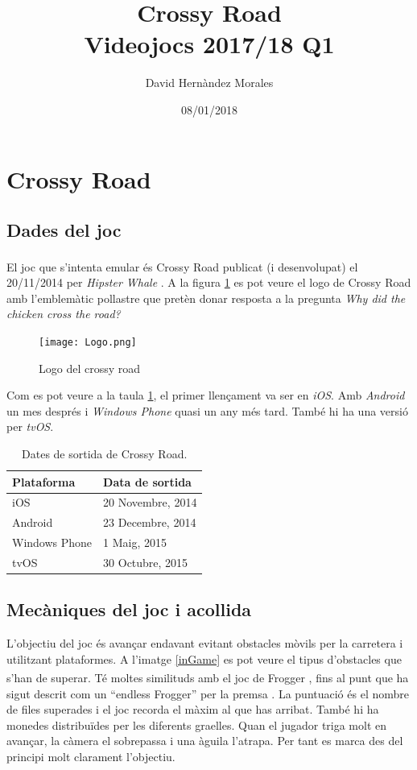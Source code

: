 \documentclass{article}
\title{Crossy Road \\
		\large Videojocs 2017/18 Q1}
\author{David Hernàndez Morales}
\date{08/01/2018}
\begin{document}
\maketitle
\newpage
\tableofcontents
\newpage
{}
\section{Crossy Road}
\subsection{Dades del joc}
El joc que s'intenta emular és Crossy Road \textsuperscript{\texttrademark}
publicat (i desenvolupat) el 20/11/2014 per \textit{Hipster Whale} \cite{webCrossy}
\cite{wikipediaCrossy}. A la figura \ref{logo} es pot veure el logo de Crossy Road
amb l'emblemàtic pollastre que pretèn donar resposta a la pregunta
\textit{Why did the chicken cross the road?} \cite{preguntaChicken}

\begin{figure}[h!]
	\texttt{[image: Logo.png]}
	\caption{Logo del crossy road}
	\label{logo}
\end{figure}

Com es pot veure a la taula \ref{dadesSortida}, el primer llençament va ser en
\textit{iOS}. Amb \textit{Android} un mes després i \textit{Windows Phone}
quasi un any més tard. També hi ha una versió per \textit{tvOS}.

\begin{table}[h!]
	\begin{center}		
		\begin{tabular}{l|l}
		\textbf{Plataforma} & \textbf{Data de sortida} \\
		\hline
		iOS & 20 Novembre, 2014 \\
		Android & 23 Decembre, 2014 \\
		Windows Phone & 1 Maig, 2015 \\
		tvOS & 30 Octubre, 2015
		\end{tabular}
		\caption{Dates de sortida de Crossy Road.}
		\label{dadesSortida}
	\end{center}
\end{table}

\subsection{Mecàniques del joc i acollida}

L'objectiu del joc és avançar endavant evitant obstacles mòvils per la
carretera i utilitzant plataformes. A l'imatge \ref{inGame}
es pot veure el tipus d'obstacles que s'han de superar.
Té moltes similituds amb el joc de
Frogger \textsuperscript{\texttrademark}, fins al punt que ha sigut
descrit com un ``endless Frogger'' per la premsa \cite{endlessFrogger1}
\cite{endlessFrogger2}. La puntuació és el nombre de files superades i
el joc recorda el màxim al que has arribat. També hi ha monedes distribuïdes
per les diferents graelles. Quan el jugador triga molt en avançar, la càmera
el sobrepassa i una àguila l'atrapa. Per tant es marca des del principi molt
clarament l'objectiu. \newline
\end{document}
